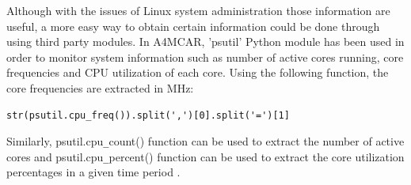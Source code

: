 Although with the issues of Linux system administration those information are useful, a more easy way to obtain certain information could be done through using third party modules. In A4MCAR, 'psutil' Python module has been used in order to monitor system information such as number of active cores running, core frequencies and CPU utilization of each core. 
Using the following function, the core frequencies are extracted in MHz:
\begin{lstlisting}
str(psutil.cpu_freq()).split(',')[0].split('=')[1]
\end{lstlisting}
Similarly, psutil.cpu\texttt{\_}count() function can be used to extract the number of active cores and psutil.cpu\texttt{\_}percent() function can be used to extract the core utilization percentages in a given time period \cite{psutil}. 

